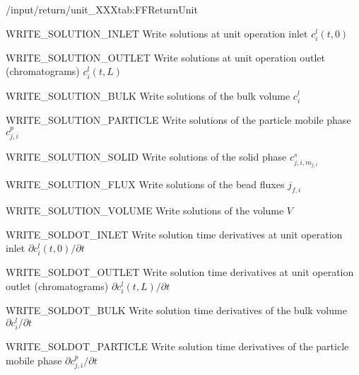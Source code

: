 \begin{groupscope}{/input/return/unit\_XXX}{tab:FFReturnUnit}
  \begin{dataset}[type=int, range={$\{0,1\}$}]{WRITE\_SOLUTION\_INLET}
    Write solutions at unit operation inlet $c^l_i(t,0)$
  \end{dataset}
  \begin{dataset}[type=int, range={$\{0,1\}$}]{WRITE\_SOLUTION\_OUTLET}
    Write solutions at unit operation outlet (chromatograms) $c^l_i(t,L)$
  \end{dataset}
  \begin{dataset}[type=int, range={$\{0,1\}$}]{WRITE\_SOLUTION\_BULK}
    Write solutions of the bulk volume $c^l_i$
  \end{dataset}
  \begin{dataset}[type=int, range={$\{0,1\}$}]{WRITE\_SOLUTION\_PARTICLE}
    Write solutions of the particle mobile phase $c^p_{j,i}$
  \end{dataset}
  \begin{dataset}[type=int, range={$\{0,1\}$}]{WRITE\_SOLUTION\_SOLID}
    Write solutions of the solid phase $c^s_{j,i,m_{j,i}}$
  \end{dataset}
  \begin{dataset}[type=int, range={$\{0,1\}$}]{WRITE\_SOLUTION\_FLUX}
    Write solutions of the bead fluxes $j_{f,i}$
  \end{dataset}
  \begin{dataset}[type=int, range={$\{0,1\}$}]{WRITE\_SOLUTION\_VOLUME}
    Write solutions of the volume $V$
  \end{dataset}
  \begin{dataset}[type=int, range={$\{0,1\}$}]{WRITE\_SOLDOT\_INLET}
    Write solution time derivatives at unit operation inlet $\partial c^l_i(t,0) / \partial t$
  \end{dataset}
  \begin{dataset}[type=int, range={$\{0,1\}$}]{WRITE\_SOLDOT\_OUTLET}
    Write solution time derivatives at unit operation outlet (chromatograms) $\partial c^l_i(t,L) / \partial t$
  \end{dataset}
  \begin{dataset}[type=int, range={$\{0,1\}$}]{WRITE\_SOLDOT\_BULK}
    Write solution time derivatives of the bulk volume $\partial c^l_i / \partial t$
  \end{dataset}
  \begin{dataset}[type=int, range={$\{0,1\}$}]{WRITE\_SOLDOT\_PARTICLE}
    Write solution time derivatives of the particle mobile phase $\partial c^p_{j,i} / \partial t$

\end{dataset}
\end{groupscope}
